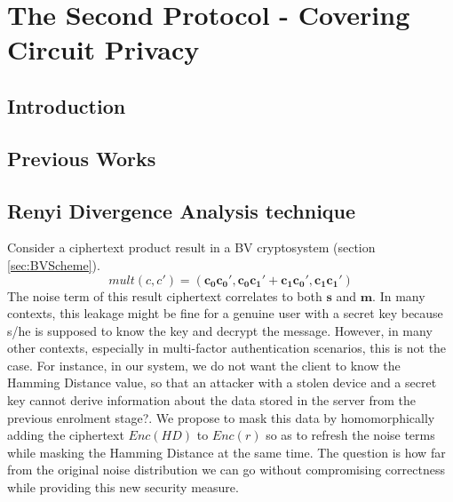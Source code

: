 \chapter{The Second Protocol - Covering Circuit Privacy}
\label{chap:renyiDivergence}

\ifpdf
    \graphicspath{{Chapter4/Figs/Raster/}{Chapter4/Figs/PDF/}{Chapter4/Figs/}}
\else
    \graphicspath{{Chapter4/Figs/Vector/}{Chapter4/Figs/}}
\fi

\section{Introduction}
\label{sec:secProcIntro}

\section{Previous Works}
\label{sec:secProcPrevious}

\section{Renyi Divergence Analysis technique}
\label{sec:secProcRenyi}
Consider a ciphertext product result  in a BV cryptosystem (section \ref{sec:BVScheme}).
\[
mult(c,c') = (\mathbf{c_0}\mathbf{c_0'}, \mathbf{c_0}\mathbf{c_1'} + \mathbf{c_1}\mathbf{c_0'}, \mathbf{c_1}\mathbf{c_1'})
\]
The noise term of this result ciphertext correlates to both $\mathbf{s}$ and $\mathbf{m}$.
In many contexts, this leakage might be fine for a genuine user with a secret key because s/he is supposed to know the key and decrypt the message.
However, in many other contexts, especially in multi-factor authentication
scenarios, this is not the case. For instance, in our system, we do not want the
client to know the Hamming Distance value, so that an attacker with a stolen
device and a secret key cannot derive information about the data stored in the
server from the previous enrolment stage?. We propose to mask this data by homomorphically adding the ciphertext
$Enc(HD)$ to $Enc(r)$ so as to refresh the noise terms while masking the Hamming Distance at the same time. The question is how far from the original noise distribution we can go without compromising correctness while providing
this new security measure.

